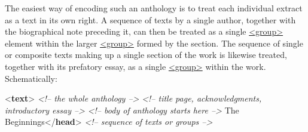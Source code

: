 The easiest way of encoding such an anthology is to treat each individual extract as a text in its own right. A sequence of texts by a single author, together with the biographical note preceding it, can then be treated as a single \hyperref[TEI.group]{<group>} element within the larger \hyperref[TEI.group]{<group>} formed by the section. The sequence of single or composite texts making up a single section of the work is likewise treated, together with its prefatory essay, as a single \hyperref[TEI.group]{<group>} within the work. Schematically: \par\bgroup{}\exampleFont \begin{shaded}\noindent\mbox{}{<\textbf{text}>}\mbox{}\newline 
\textit{<!-- the whole anthology -->}\mbox{}\newline 
{}\mbox{}\newline 
\textit{<!-- title page, acknowledgments, introductory essay -->}\mbox{}\newline 
{}\mbox{}\newline 
{}\mbox{}\newline 
\textit{<!-- body of anthology starts here -->}\mbox{}\newline 
\hspace*{1em}\mbox{}\newline 
\hspace*{1em}\hspace*{1em}The Beginnings{</\textbf{head}>}\mbox{}\newline 
\textit{<!-- sequence of texts or groups -->}\mbox{}\newline 

\end{shaded}
